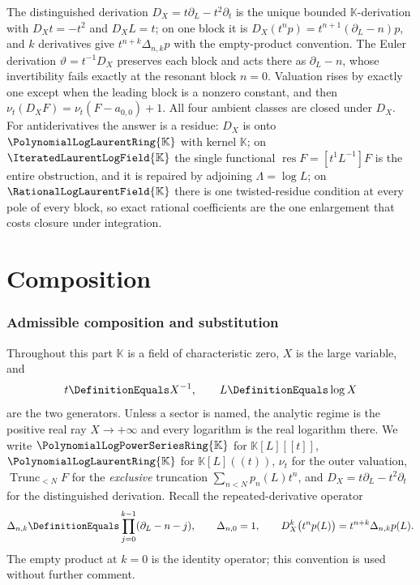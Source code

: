 \documentclass[11pt,oneside]{article}
\theoremstyle{plain}
\theoremstyle{definition}
\theoremstyle{remark}
\newcommand{\K}{\mathbb{K}}
\newcommand{\PLpow}{\PolynomialLogPowerSeriesRing{\K}}   %
\newcommand{\PLlau}{\PolynomialLogLaurentRing{\K}}       %
\newcommand{\PLrat}{\RationalLogLaurentField{\K}}        %
\newcommand{\PLit}{\IteratedLaurentLogField{\K}}         %
\newcommand{\ordt}{\nu_{t}}                              %
\newcommand{\Trunc}[2]{\operatorname{Trunc}_{<#2}#1}     %
\newcommand{\DX}{D_{X}}                                  %
\newcommand{\EulerOp}{\vartheta}                         %
\newcommand{\shiftop}[2]{\Delta_{#1,#2}}                 %
\begin{document}
\begin{summarybox}
The distinguished derivation \(\DX=t\partial_{L}-t^{2}\partial_{t}\) is the
unique bounded \(\K\)-derivation with \(\DX t=-t^{2}\) and \(\DX L=t\); on one
block it is \(\DX(t^{n}p)=t^{n+1}(\partial_{L}-n)p\), and \(k\) derivatives
give \(t^{n+k}\shiftop{n}{k}p\) with the empty-product convention.  The Euler
derivation \(\EulerOp=t^{-1}\DX\) preserves each block and acts there as
\(\partial_{L}-n\), whose invertibility fails exactly at the resonant block
\(n=0\).  Valuation rises by exactly one except when the leading block is a
nonzero constant, and then \(\ordt(\DX F)=\ordt(F-a_{0,0})+1\).  All four
ambient classes are closed under \(\DX\).  For antiderivatives the answer is a
residue: \(\DX\) is onto \(\PLlau\) with kernel \(\K\); on \(\PLit\) the single
functional \(\operatorname{res}F=[t^{1}L^{-1}]F\) is the entire obstruction, and
it is repaired by adjoining \(\Lambda=\log L\); on \(\PLrat\) there is one
twisted-residue condition at every pole of every block, so exact rational
coefficients are the one enlargement that costs closure under integration.
\end{summarybox}

\clearpage
\part{Composition}

\section{Admissible composition and substitution}
\label{plt:sec:composition}

Throughout this part \(\K\) is a field of characteristic zero, \(X\) is the
large variable, and
\[
 t\DefinitionEquals X^{-1},
 \qquad
 L\DefinitionEquals\log X
\]
are the two generators.  Unless a sector is named, the analytic regime is the
positive real ray \(X\to+\infty\) and every logarithm is the real logarithm
there.  We write \(\PLpow\) for \(\K[L][[t]]\), \(\PLlau\) for \(\K[L]((t))\),
\(\ordt\) for the outer valuation, \(\Trunc{F}{N}\) for the \emph{exclusive}
truncation \(\sum_{n<N}p_n(L)t^n\), and \(\DX=t\partial_L-t^2\partial_t\) for
the distinguished derivation.  Recall the repeated-derivative operator
\begin{equation}\label{plt:eq:cmp-shiftop}
 \shiftop{n}{k}
 \DefinitionEquals\prod_{j=0}^{k-1}(\partial_L-n-j),
 \qquad
 \shiftop{n}{0}=1,
 \qquad
 \DX^k\bigl(t^np(L)\bigr)=t^{n+k}\shiftop{n}{k}p(L).
\end{equation}
The empty product at \(k=0\) is the identity operator; this convention is used
without further comment.
\end{document}
